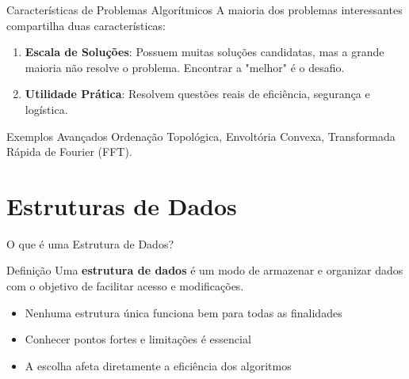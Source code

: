 \documentclass[9pt]{beamer}
\begin{document}
\begin{frame}{Características de Problemas Algorítmicos}
    A maioria dos problemas interessantes compartilha duas características:
    \vspace{0.3cm}
    \begin{enumerate}
        \item \textbf{Escala de Soluções}: Possuem muitas soluções candidatas, mas a grande maioria não resolve o problema. Encontrar a "melhor" é o desafio.
        \item \textbf{Utilidade Prática}: Resolvem questões reais de eficiência, segurança e logística.
    \end{enumerate}
    \vspace{0.4cm}
    \begin{exampleblock}{Exemplos Avançados}
        Ordenação Topológica, Envoltória Convexa, Transformada Rápida de Fourier (FFT).
    \end{exampleblock}
\end{frame}

\section{Estruturas de Dados}

\begin{frame}{O que é uma Estrutura de Dados?}
    \begin{block}{Definição}
        Uma \textbf{estrutura de dados} é um modo de armazenar e organizar dados com o objetivo de facilitar acesso e modificações.
    \end{block}
    \vspace{0.3cm}
    \begin{itemize}
        \item Nenhuma estrutura única funciona bem para todas as finalidades
        \item Conhecer pontos fortes e limitações é essencial
        \item A escolha afeta diretamente a eficiência dos algoritmos
    \end{itemize}
\end{frame}
\end{document}
